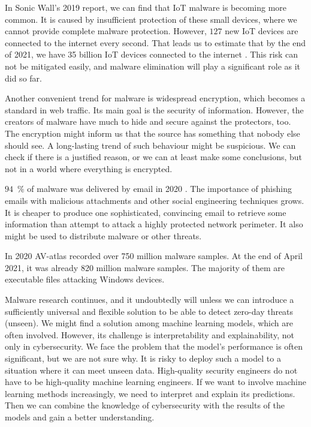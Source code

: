 In Sonic Wall's 2019 report, we can find that IoT malware is becoming more common. It is caused by insufficient protection of these small devices, where we cannot provide complete malware protection. However, $127$ new IoT devices are connected to the internet every second. That leads us to estimate that by the end of 2021, we have 35 billion IoT devices connected to the internet \cite{TheIoTRu52:online}. This risk can not be mitigated easily, and malware elimination will play a significant role as it did so far.

Another convenient trend for malware is widespread encryption, which becomes a standard in web traffic. Its main goal is the security of information. However, the creators of malware have much to hide and secure against the protectors, too. The encryption might inform us that the source has something that nobody else should see. A long-lasting trend of such behaviour might be suspicious. We can check if there is a justified reason, or we can at least make some conclusions, but not in a world where everything is encrypted.

$94$~\% of malware was delivered by email in 2020 \cite{Topcyber13:online}. The importance of phishing emails with malicious attachments and other social engineering techniques grows. It is cheaper to produce one sophisticated, convincing email to retrieve some information than attempt to attack a highly protected network perimeter. It also might be used to distribute malware or other threats.

In 2020 AV-atlas \cite{AVATLASM39:online} recorded over 750 million malware samples. At the end of April 2021, it was already 820 million malware samples. The majority of them are executable files attacking Windows devices.

Malware research continues, and it undoubtedly will unless we can introduce a sufficiently universal and flexible solution to be able to detect zero-day threats (unseen). We might find a solution among machine learning models, which are often involved. However, its challenge is interpretability and explainability, not only in cybersecurity. We face the problem that the model's performance is often significant, but we are not sure why. It is risky to deploy such a model to a situation where it can meet unseen data. High-quality security engineers do not have to be high-quality machine learning engineers. If we want to involve machine learning methods increasingly, we need to interpret and explain its predictions. Then we can combine the knowledge of cybersecurity with the results of the models and gain a better understanding. 


